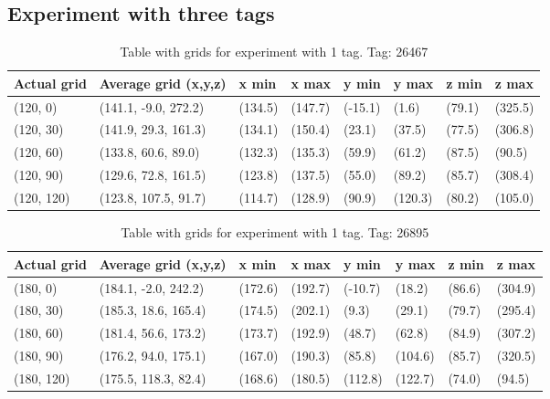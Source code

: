 \subsection{Experiment with three tags}
\begin{table}[] 
    \begin{tabular}{|l|l|l|l|l|l|l|l|}
    \hline
    Actual grid & Average grid (x,y,z)   & x min   & x max   & y min    & y max   & z min   & z max    \\ \hline
    (120, 0)     & (141.1, -9.0, 272.2)      & (134.5)     & (147.7)    & (-15.1)     & (1.6)      & (79.1)     & (325.5)     \\ \hline
    (120, 30)     & (141.9, 29.3, 161.3)      & (134.1)     & (150.4)    & (23.1)     & (37.5)      & (77.5)     & (306.8)     \\ \hline
    (120, 60)     & (133.8, 60.6, 89.0)      & (132.3)     & (135.3)    & (59.9)     & (61.2)      & (87.5)     & (90.5)     \\ \hline
    (120, 90)     & (129.6, 72.8, 161.5)      & (123.8)     & (137.5)    & (55.0)     & (89.2)      & (85.7)     & (308.4)     \\ \hline
    (120, 120)     & (123.8, 107.5, 91.7)      & (114.7)     & (128.9)    & (90.9)     & (120.3)      & (80.2)     & (105.0)     \\ \hline
\end{tabular}
\label{Tab:three-tag-experiment-result-tag-26467}
\caption{Table with grids for experiment with 1 tag. Tag: 26467}
\end{table}

\begin{table}[] 
    \begin{tabular}{|l|l|l|l|l|l|l|l|}
    \hline
    Actual grid & Average grid (x,y,z)   & x min   & x max   & y min    & y max   & z min   & z max    \\ \hline
    (180, 0)     & (184.1, -2.0, 242.2)      & (172.6)     & (192.7)    & (-10.7)     & (18.2)      & (86.6)     & (304.9)    \\ \hline
    (180, 30)     & (185.3, 18.6, 165.4)      & (174.5)     & (202.1)    & (9.3)     & (29.1)      & (79.7)     & (295.4)    \\ \hline
    (180, 60)     & (181.4, 56.6, 173.2)      & (173.7)     & (192.9)    & (48.7)     & (62.8)      & (84.9)     & (307.2)    \\ \hline
    (180, 90)     & (176.2, 94.0, 175.1)      & (167.0)     & (190.3)    & (85.8)     & (104.6)      & (85.7)     & (320.5)    \\ \hline
    (180, 120)     & (175.5, 118.3, 82.4)      & (168.6)     & (180.5)    & (112.8)     & (122.7)      & (74.0)     & (94.5)    \\ \hline
\end{tabular}
\label{Tab:three-tag-experiment-result-tag-26895}
\caption{Table with grids for experiment with 1 tag. Tag: 26895}
\end{table}

